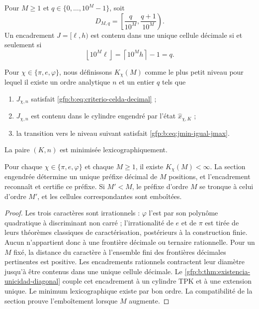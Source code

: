 Pour \(M\geq1\) et \(q\in\{0,\ldots,10^M-1\}\), soit
\[
 D_{M,q}=
 \left[
 \frac{q}{10^M},
 \frac{q+1}{10^M}
 \right).
\]
Un encadrement \(J=[\ell,h)\) est contenu dans une unique cellule décimale si
et seulement si
\begin{equation}
 \boxed{
 \left\lfloor10^M\ell\right\rfloor
 =\left\lceil10^Mh\right\rceil-1=q.}
 \label{gfp:b:eq:criterio-celda-decimal}
\end{equation}

\begin{definition}
Pour \(\chi\in\{\pi,e,\varphi\}\), nous définissons \(K_\chi(M)\) comme le plus petit
niveau pour lequel il existe un ordre analytique \(n\) et un entier \(q\) tels
que
\begin{enumerate}
 \item \(J_{\chi,n}\) satisfait
       \eqref{gfp:b:eq:criterio-celda-decimal} ;
 \item \(J_{\chi,n}\) est contenu dans le cylindre engendré par
       l’état \(\widehat x_{\chi,K}\) ;
 \item la transition vers le niveau suivant satisfait
       \eqref{gfp:b:eq:jmin-igual-jmax}.
\end{enumerate}
La paire \((K,n)\) est minimisée lexicographiquement.
\end{definition}

\begin{theorem}
\label{gfp:b:thm:precision-decimal-arbitraria}
Pour chaque \(\chi\in\{\pi,e,\varphi\}\) et chaque \(M\geq1\), il existe
\(K_\chi(M)<\infty\). La section engendrée détermine un unique préfixe décimal
de \(M\) positions, et l’encadrement reconnaît et certifie ce préfixe. Si
\(M'<M\), le préfixe d’ordre \(M\) se tronque à celui
d’ordre \(M'\), et les cellules correspondantes sont emboîtées.
\end{theorem}

\begin{proof}
Les trois caractères sont irrationnels : \(\varphi\) l’est par son polynôme
quadratique à discriminant non carré ; l’irrationalité de \(e\) et de
\(\pi\) est tirée de leurs théorèmes classiques de caractérisation, postérieurs à
la construction finie. Aucun n’appartient donc à une frontière décimale ou
ternaire rationnelle. Pour un \(M\) fixé, la distance du caractère à l’ensemble
fini des frontières décimales pertinentes est positive. Les encadrements
rationnels contractent leur diamètre jusqu’à être contenus dans une unique cellule décimale.
Le \cref{gfp:b:thm:existencia-unicidad-diagonal} couple cet encadrement à un
cylindre TPK et à une extension unique. Le minimum lexicographique existe par
bon ordre. La compatibilité de la section prouve l’emboîtement lorsque
\(M\) augmente.
\end{proof}

